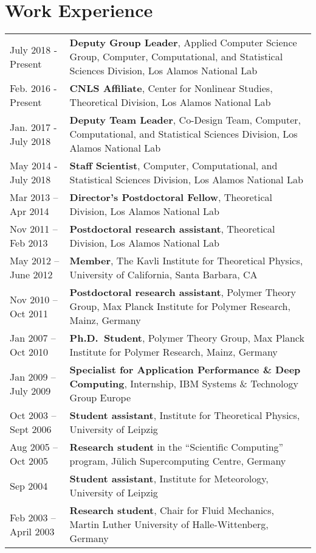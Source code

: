 \documentclass{article}
\begin{document}
\section*{Work Experience}
\begin{tabular}{p{}p{}}
July 2018 - Present & \textbf{Deputy Group Leader}, Applied Computer Science Group, Computer, Computational, and Statistical Sciences Division, Los Alamos National Lab \\
Feb. 2016 - Present & \textbf{CNLS Affiliate}, Center for Nonlinear Studies, Theoretical Division, Los Alamos National Lab \\
Jan. 2017 - July 2018 & \textbf{Deputy Team Leader}, Co-Design Team, Computer, Computational, and Statistical Sciences Division, Los Alamos National Lab \\
May  2014 - July 2018 & \textbf{Staff Scientist}, Computer, Computational, and Statistical Sciences Division, Los Alamos National Lab \\
Mar 2013 -- Apr 2014 & \textbf{Director's Postdoctoral Fellow}, Theoretical Division, Los Alamos National Lab\\
Nov 2011 -- Feb 2013 & \textbf{Postdoctoral research assistant}, Theoretical Division, Los Alamos National Lab\\
May 2012 -- June 2012 & \textbf{Member}, The Kavli Institute for Theoretical Physics, University of California, Santa Barbara, CA \\
Nov 2010 -- Oct 2011 & \textbf{Postdoctoral research assistant}, Polymer Theory Group, Max Planck Institute for Polymer Research, Mainz, Germany\\
Jan 2007 -- Oct 2010 & \textbf{Ph.D.\ Student}, Polymer Theory Group, Max Planck Institute for Polymer Research, Mainz, Germany\\
Jan 2009 -- July 2009 & \textbf{Specialist for Application Performance \& Deep Computing}, Internship, IBM Systems \& Technology Group Europe \\
Oct 2003 -- Sept 2006 & \textbf{Student assistant}, Institute for Theoretical Physics, University of Leipzig \\
Aug 2005 -- Oct 2005 & \textbf{Research student} in the ``Scientific Computing'' program, J{\"u}lich Supercomputing Centre, Germany \\
Sep 2004 & \textbf{Student assistant}, Institute for Meteorology, University of Leipzig \\
Feb 2003 -- April 2003 & \textbf{Research student}, Chair for Fluid Mechanics, Martin Luther University of Halle-Wittenberg, Germany \\
\end{tabular}
\end{document}
